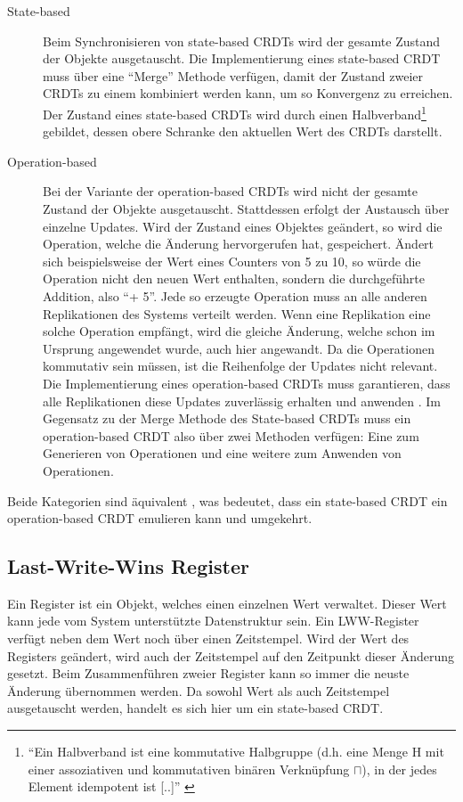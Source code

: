 \documentclass[a4paper, 12pt]{scrreprt}
\begin{document}
\begin{description}
\label{sec:stateopbased}
	\item[State-based]
	Beim Synchronisieren von state-based \acp{CRDT} wird der gesamte Zustand der Objekte ausgetauscht. Die Implementierung eines state-based CRDT muss über eine \enquote{Merge} Methode verfügen, damit der Zustand zweier \acp{CRDT} zu einem kombiniert werden kann, um so Konvergenz zu erreichen. Der Zustand eines state-based \acp{CRDT} wird durch einen Halbverband\footnote{\enquote{Ein Halbverband ist eine kommutative Halbgruppe (d.h. eine Menge H mit einer assoziativen und kommutativen binären Verknüpfung $\sqcap$), in der jedes Element idempotent ist [..]} \autocite{MiscHalbverband}} gebildet, dessen obere Schranke den aktuellen Wert des \acp{CRDT} darstellt. \autocite{InproceedingsStateBased}
	
	\item[Operation-based]
	Bei der Variante der operation-based \acp{CRDT} wird nicht der gesamte Zustand der Objekte ausgetauscht. Stattdessen erfolgt der Austausch über einzelne Updates. Wird der Zustand eines Objektes geändert, so wird die Operation, welche die Änderung hervorgerufen hat, gespeichert. Ändert sich beispielsweise der Wert eines Counters von 5 zu 10, so würde die Operation nicht den neuen Wert enthalten, sondern die durchgeführte Addition, also \enquote{+ 5}. Jede so erzeugte Operation muss an alle anderen Replikationen des Systems verteilt werden. Wenn eine Replikation eine solche Operation empfängt, wird die gleiche Änderung, welche schon im Ursprung angewendet wurde, auch hier angewandt. Da die Operationen kommutativ sein müssen, ist die Reihenfolge der Updates nicht relevant. Die Implementierung eines operation-based \acp{CRDT} muss garantieren, dass alle Replikationen diese Updates zuverlässig erhalten und anwenden \autocite[S.18-19]{ArticleCRDTOverview}. Im Gegensatz zu der Merge Methode des State-based \acp{CRDT} muss ein operation-based CRDT also über zwei Methoden verfügen: Eine zum Generieren von Operationen und eine weitere zum Anwenden von Operationen.
\end{description} 

Beide Kategorien sind äquivalent \autocite[S. 9]{InproceedingsCRDTOriginal}, was bedeutet, dass ein state-based CRDT ein operation-based CRDT emulieren kann und umgekehrt.


\subsection{Last-Write-Wins Register}
\label{sec:lwwRegister}
\sloppypar
Ein Register ist ein Objekt, welches einen einzelnen Wert verwaltet. Dieser Wert kann jede vom System unterstützte Datenstruktur sein. Ein \ac{LWW-Register} verfügt neben dem Wert noch über einen Zeitstempel. Wird der Wert des Registers geändert, wird auch der Zeitstempel auf den Zeitpunkt dieser Änderung gesetzt. Beim Zusammenführen zweier Register kann so immer die neuste Änderung übernommen werden. Da sowohl Wert als auch Zeitstempel ausgetauscht werden, handelt es sich hier um ein state-based CRDT.
\end{document}

